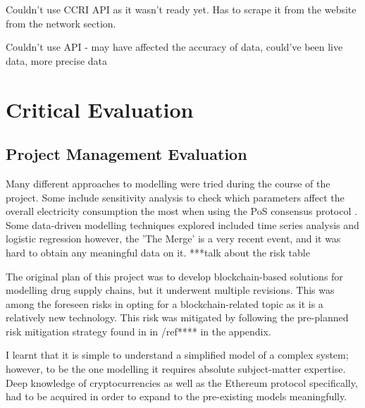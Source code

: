 Couldn't use CCRI API as it wasn't ready yet. Has to scrape it from the website from the network section.

Couldn't use API - may have affected the accuracy of data, could've been live data, more precise data

\section{Critical Evaluation}

\subsection{Project Management Evaluation}

Many different approaches to modelling were tried during the course of the project. Some include sensitivity analysis to check which parameters affect the overall electricity consumption the most when using the PoS consensus protocol \cite{MarionAnModelling}. Some data-driven modelling techniques explored included time series analysis and logistic regression \cite{IbanezTheExpansion} however, the 'The Merge' is a very recent event, and it was hard to obtain any meaningful data on it.  ***talk about the risk table

The original plan of this project was to develop blockchain-based solutions for modelling drug supply chains, but it underwent multiple revisions. This was among the foreseen risks in opting for a blockchain-related topic as it is a relatively new technology. This risk was mitigated by following the pre-planned risk mitigation strategy found in in /ref**** in the appendix.

I learnt that it is simple to understand a simplified model of a complex system; however, to be the one modelling it requires absolute subject-matter expertise. Deep knowledge of cryptocurrencies as well as the Ethereum protocol specifically, had to be acquired in order to expand to the pre-existing models meaningfully. 